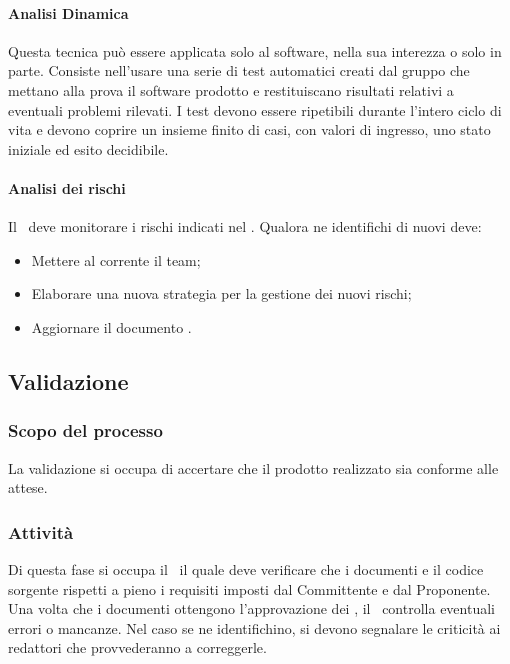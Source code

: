 \documentclass[../NormeDiProgetto.tex]{subfiles}
\begin{document}
				\paragraph{Analisi Dinamica\\}
					Questa tecnica può essere applicata solo al software, nella sua interezza o solo
					in parte.
					Consiste nell'usare una serie di test automatici creati dal gruppo che mettano
					alla prova il software prodotto e restituiscano risultati relativi a eventuali
					problemi rilevati.
					I test devono essere ripetibili durante l'intero ciclo di vita e devono coprire
					un insieme finito di casi, con valori di ingresso, uno stato iniziale ed esito
					decidibile.
				\paragraph{Analisi dei rischi\\}
					Il \responsabilediprogetto\ deve monitorare i rischi indicati nel \pianodiprogettov.
					Qualora ne identifichi di nuovi deve:
					\begin{itemize}
						\item Mettere al corrente il team;
						\item Elaborare una nuova strategia per la gestione dei nuovi rischi;
						\item Aggiornare il documento \pianodiprogetto.
					\end{itemize}
		\subsection{Validazione}
			\subsubsection{Scopo del processo}
				La validazione si occupa di accertare che il prodotto realizzato sia conforme
				alle attese.
			\subsubsection{Attività}
				Di questa fase si occupa il \responsabilediprogetto\ il quale deve verificare
				che i documenti e il codice sorgente rispetti a pieno i requisiti imposti dal
				Committente e dal Proponente.\\
				Una volta che i	documenti ottengono l'approvazione dei \verificatori, il
				\responsabilediprogetto\ controlla eventuali errori o mancanze.
				Nel caso se ne identifichino, si devono segnalare le criticità ai
				redattori che provvederanno a correggerle.
\end{document}
